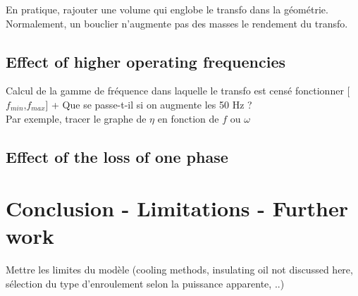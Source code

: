\documentclass[12pt,a4paper]{report}
\begin{document}
En pratique, rajouter une volume qui englobe le transfo dans la géométrie. Normalement, un bouclier n'augmente pas des masses le rendement du transfo.

\subsection{Effect of higher operating frequencies}
Calcul de la gamme de fréquence dans laquelle le transfo est censé fonctionner [$f_{min}$,$f_{max}$] + Que se passe-t-il si on augmente les 50 Hz ?\\

Par exemple, tracer le graphe de $\eta$ en fonction de $f$ ou $\omega$

\subsection{Effect of the loss of one phase}

\section{Conclusion - Limitations - Further work}
Mettre les limites du modèle (cooling methods, insulating oil not discussed here, sélection du type d'enroulement selon la puissance apparente, ..)
\end{document}
